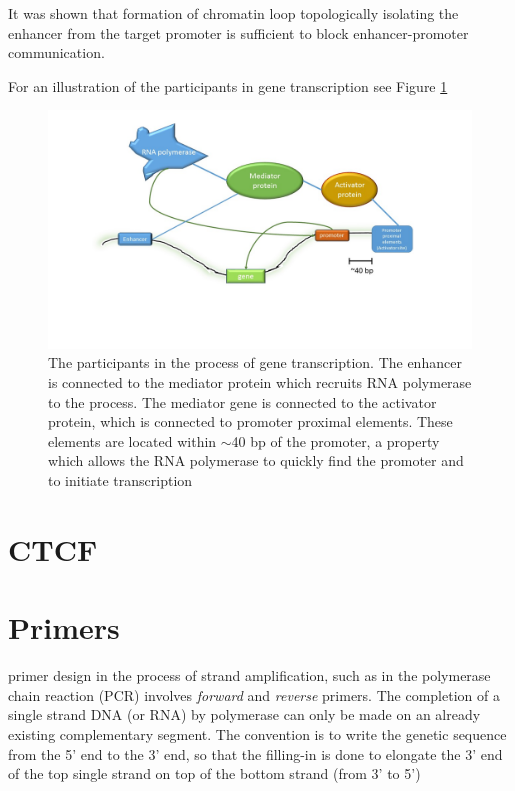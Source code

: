\documentclass[12pt]{paper}
\begin{document}
It was shown that formation of chromatin loop topologically isolating the enhancer from the target promoter is sufficient to block enhancer-promoter communication. 


For an illustration of the participants in gene transcription see Figure \ref{mechanismOfGeneTranscription}

\begin{figure}[H]
\includegraphics[scale=0.5]{mechanismOfGeneTransciption}
\caption{The participants in the process of gene transcription. The enhancer is connected to the mediator protein which recruits RNA polymerase to the process. The mediator gene is connected to the activator protein, which is connected to promoter proximal elements. These elements are located within $\sim$40 bp of the promoter, a property which allows the RNA polymerase to quickly find the promoter and to initiate transcription}
\label{mechanismOfGeneTranscription}
\end{figure}

\section{CTCF}\label{section_CTCF}

\section{Primers}\label{section_primers}
primer design in the process of strand amplification, such as in the polymerase chain reaction (PCR) involves \textit{forward} and \textit{reverse} primers. The completion of a single strand DNA (or RNA) by polymerase can only be made on an already existing complementary segment. The convention is to write the genetic sequence from the 5' end to the 3' end, so that the filling-in is done to elongate the 3' end of the top single strand on top of the bottom strand (from 3' to 5')

\end{document}
